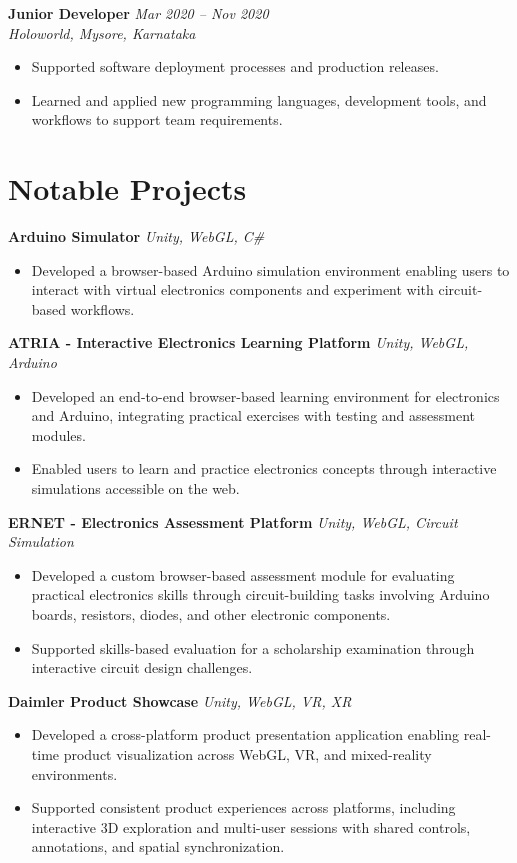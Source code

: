 \documentclass[a4paper,10pt]{article}
\newcommand{\experience}[4]{
    \textbf{#1} \hfill \textit{#2}\\
    \textit{#3}\\[-3pt]
    #4
    \vspace{3pt}
}
\begin{document}
\experience
{Junior Developer}
{Mar 2020 -- Nov 2020}
{Holoworld, Mysore, Karnataka}
{
\begin{itemize}
    \item Supported software deployment processes and production
          releases.
    \item Learned and applied new programming languages, development
          tools, and workflows to support team requirements.
\end{itemize}
}

\section{Notable Projects}

\textbf{Arduino Simulator}
\hfill \textit{Unity, WebGL, C\#}
\begin{itemize}
    \item Developed a browser-based Arduino simulation environment
    enabling users to interact with virtual electronics components
    and experiment with circuit-based workflows.
\end{itemize}

\textbf{ATRIA - Interactive Electronics Learning Platform}
\hfill \textit{Unity, WebGL, Arduino}
\begin{itemize}
    \item Developed an end-to-end browser-based learning environment
    for electronics and Arduino, integrating practical exercises
    with testing and assessment modules.
    \item Enabled users to learn and practice electronics concepts
    through interactive simulations accessible on the web.
\end{itemize}

\textbf{ERNET - Electronics Assessment Platform}
\hfill \textit{Unity, WebGL, Circuit Simulation}
\begin{itemize}
    \item Developed a custom browser-based assessment module for
    evaluating practical electronics skills through circuit-building
    tasks involving Arduino boards, resistors, diodes, and other
    electronic components.
    \item Supported skills-based evaluation for a scholarship
    examination through interactive circuit design challenges.
\end{itemize}

\textbf{Daimler Product Showcase}
\hfill \textit{Unity, WebGL, VR, XR}
\begin{itemize}
    \item Developed a cross-platform product presentation application
    enabling real-time product visualization across WebGL, VR,
    and mixed-reality environments.
    \item Supported consistent product experiences across platforms,
    including interactive 3D exploration and multi-user sessions
    with shared controls, annotations, and spatial synchronization.
\end{itemize}
\end{document}

